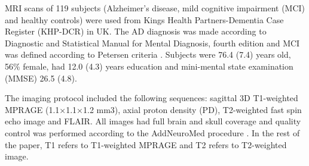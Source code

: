 MRI scans of 119 subjects (Alzheimer’s disease, mild cognitive impairment (MCI) and healthy controls) were used from Kings Health Partners-Dementia Case Register (KHP-DCR) in UK. The AD diagnosis was made according to Diagnostic and Statistical Manual for Mental Diagnosis, fourth edition and MCI was defined according to Petersen criteria \cite{PetersonMCI}. Subjects were 76.4 (7.4) years old, 56\% female, had 12.0 (4.3) years education and mini-mental state examination (MMSE) 26.5 (4.8).
\par
The imaging protocol included the following sequences: sagittal 3D T1-weighted MPRAGE (1.1×1.1×1.2 mm3), axial proton density (PD), T2-weighted fast spin echo image and FLAIR. All images had full brain and skull coverage and quality control was performed according to the AddNeuroMed procedure \cite{AddNeuroMed}. In the rest of the paper, T1 refers to T1-weighted MPRAGE and T2 refers to T2-weighted image.

    
    
    
    
    
    
    